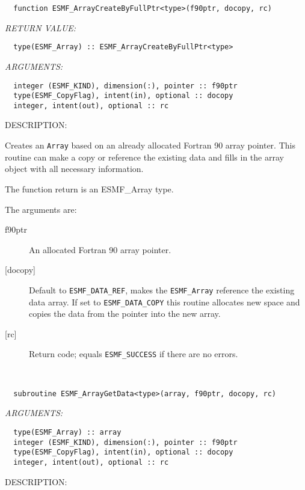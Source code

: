   
\begin{verbatim}  function ESMF_ArrayCreateByFullPtr<type>(f90ptr, docopy, rc) 
   \end{verbatim}{\em RETURN VALUE:}
\begin{verbatim}  type(ESMF_Array) :: ESMF_ArrayCreateByFullPtr<type> 
   \end{verbatim}{\em ARGUMENTS:}
\begin{verbatim}  integer (ESMF_KIND), dimension(:), pointer :: f90ptr 
  type(ESMF_CopyFlag), intent(in), optional :: docopy 
  integer, intent(out), optional :: rc 
   \end{verbatim}
{\sf DESCRIPTION:\\ }

 
   Creates an {\tt Array} based on an already allocated Fortran 90 array 
   pointer. This routine can make a copy or reference the existing data 
   and fills in the array object with all necessary information. 
   
   The function return is an ESMF\_Array type. 
   
   The arguments are: 
   \begin{description} 
   \item[f90ptr] 
   An allocated Fortran 90 array pointer. 
   
   \item[{[docopy]}] 
   Default to {\tt ESMF\_DATA\_REF}, makes the {\tt ESMF\_Array} reference 
   the existing data array. If set to {\tt ESMF\_DATA\_COPY} this routine 
   allocates new space and copies the data from the pointer into the 
   new array. 
   
   \item[{[rc]}] 
   Return code; equals {\tt ESMF\_SUCCESS} if there are no errors. 
   \end{description} 
     
    
 
\mbox{}\hrulefill\ 
 

\begin{verbatim}  subroutine ESMF_ArrayGetData<type>(array, f90ptr, docopy, rc) 
   \end{verbatim}{\em ARGUMENTS:}
\begin{verbatim}  type(ESMF_Array) :: array 
  integer (ESMF_KIND), dimension(:), pointer :: f90ptr 
  type(ESMF_CopyFlag), intent(in), optional :: docopy 
  integer, intent(out), optional :: rc 
   \end{verbatim}
{\sf DESCRIPTION:\\ }

